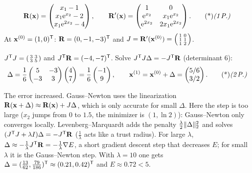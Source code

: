 \begin{solution}
\[
\vb R(\vb x)=\begin{pmatrix}x_1-1\\x_1\e^{x_2}-2\\x_1\e^{2x_2}-4\end{pmatrix},\qquad
\vb R'(\vb x)=\begin{pmatrix}1&0\\\e^{x_2}&x_1\e^{x_2}\\\e^{2x_2}&2x_1\e^{2x_2}\end{pmatrix}.\ptd{1}
\]
At $\mathbf{x}^{(0)}=(1,0)^{\mathsf{T}}$: $\mathbf{R}=(0,-1,-3)^{\mathsf{T}}$ and $J=\mathbf{R}'(\mathbf{x}^{(0)})=\begin{psmallmatrix}1&0\\1&1\\1&2\end{psmallmatrix}$. 

 $J^{\mathsf{T}} J=\begin{psmallmatrix}3&3\\3&5\end{psmallmatrix}$ and $J^{\mathsf{T}}\mathbf{R}=(-4,-7)^{\mathsf{T}}$. 
Solve $J^{\mathsf{T}} J\Delta=-J^{\mathsf{T}}\mathbf{R}$ (determinant $6$):
\[
\Delta=\frac16\begin{pmatrix}5&-3\\-3&3\end{pmatrix}\begin{pmatrix}4\\7\end{pmatrix}=\frac16\begin{pmatrix}-1\\9\end{pmatrix},\qquad \vb x^{(1)}=\vb x^{(0)}+\Delta=\begin{pmatrix}5/6\\3/2\end{pmatrix}.\ptd{2}
\]

 The error increased. Gauss--Newton uses the linearization $\mathbf{R}(\mathbf{x}+\Delta)\approx\mathbf{R}(\mathbf{x})+J\Delta$, which is only accurate for small $\Delta$. Here the step is too large ($x_2$ jumps from $0$ to $1.5$, the minimizer is $(1,\ln2)$): Gauss--Newton only converges locally. 
Levenberg--Marquardt adds the penalty $\frac\lambda2\lVert \Delta\rVert_2^2$ and solves $(J^{\mathsf{T}} J+\lambda I)\Delta=-J^{\mathsf{T}}\mathbf{R}$ ($\frac1\lambda$ acts like a trust radius). For large $\lambda$, $\Delta\approx-\frac1\lambda J^{\mathsf{T}}\mathbf{R}=-\frac1\lambda\nabla E$, a short gradient descent step that decreases $E$; for small $\lambda$ it is the Gauss--Newton step. With $\lambda=10$ one gets $\Delta=(\frac{13}{62},\frac{79}{186})^{\mathsf{T}}\approx(0.21,0.42)^{\mathsf{T}}$ and $E\approx0.72<5$. 


\end{solution}
